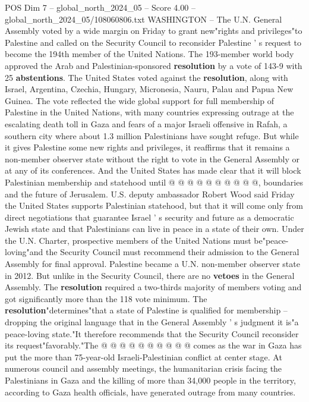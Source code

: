 \begin{textsample}{POS Dim 7 – global\_north\_2024\_05 – Score 4.00 – global\_north\_2024\_05/108060806.txt}  \label{ex:f7_pos_261}
WASHINGTON -- The U.N.
General Assembly voted by a wide margin on Friday to grant new"rights and privileges"to Palestine and called on the Security Council to reconsider Palestine ' s request to become the 194th member of the United Nations.
The 193-member world body approved the Arab and Palestinian-sponsored \textbf{resolution} by a vote of 143-9 with 25 \textbf{abstentions}.
The United States voted against the \textbf{resolution}, along with Israel, Argentina, Czechia, Hungary, Micronesia, Nauru, Palau and Papua New Guinea.
The vote reflected the wide global support for full membership of Palestine in the United Nations, with many countries expressing outrage at the escalating death toll in Gaza and fears of a major Israeli offensive in Rafah, a southern city where about 1.3 million Palestinians have sought refuge.
But while it gives Palestine some new rights and privileges, it reaffirms that it remains a non-member observer state without the right to vote in the General Assembly or at any of its conferences.
And the United States has made clear that it will block Palestinian membership and statehood until @ @ @ @ @ @ @ @ @ @, boundaries and the future of Jerusalem.
U.S. deputy ambassador Robert Wood said Friday the United States supports Palestinian statehood, but that it will come only from direct negotiations that guarantee Israel ' s security and future as a democratic Jewish state and that Palestinians can live in peace in a state of their own.
Under the U.N.
Charter, prospective members of the United Nations must be"peace-loving"and the Security Council must recommend their admission to the General Assembly for final approval.
Palestine became a U.N. non-member observer state in 2012.
But unlike in the Security Council, there are no \textbf{vetoes} in the General Assembly.
The \textbf{resolution} required a two-thirds majority of members voting and got significantly more than the 118 vote minimum.
The \textbf{resolution}"determines"that a state of Palestine is qualified for membership -- dropping the original language that in the General Assembly ' s judgment it is"a peace-loving state."It therefore recommends that the Security Council reconsider its request"favorably."The @ @ @ @ @ @ @ @ @ @ comes as the war in Gaza has put the more than 75-year-old Israeli-Palestinian conflict at center stage.
At numerous council and assembly meetings, the humanitarian crisis facing the Palestinians in Gaza and the killing of more than 34,000 people in the territory, according to Gaza health officials, have generated outrage from many countries.

\end{textsample}
